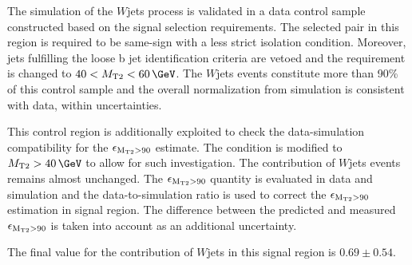 The simulation of the $W$jets process is validated in a data control sample constructed based on the \muTau signal selection requirements. The selected \muTau pair in this region is required to be same-sign with a less strict \Tau isolation condition. Moreover, jets fulfilling the loose b jet identification criteria are vetoed and the \mttwo requirement is changed to $40<\mttwo<60\,\GeV$. The $W$jets events constitute more than 90\% of this control sample and the overall normalization from simulation is consistent with data, within uncertainties.

This control region is additionally exploited to check the data-simulation compatibility for the $\epsilon_{\rm M_{T2}>90}$ estimate. The \mttwo condition is modified to $\mttwo>40\,\GeV$ to allow for such investigation. The contribution of $W$jets events remains almost unchanged. The $\epsilon_{\rm M_{T2}>90}$ quantity is evaluated in data and simulation and the data-to-simulation ratio is used to correct the $\epsilon_{\rm M_{T2}>90}$ estimation in signal region. The difference between the predicted and measured $\epsilon_{\rm M_{T2}>90}$ is taken into account as an additional uncertainty. 

The final value for the contribution of $W$jets in this signal region is $0.69\pm0.54$.

